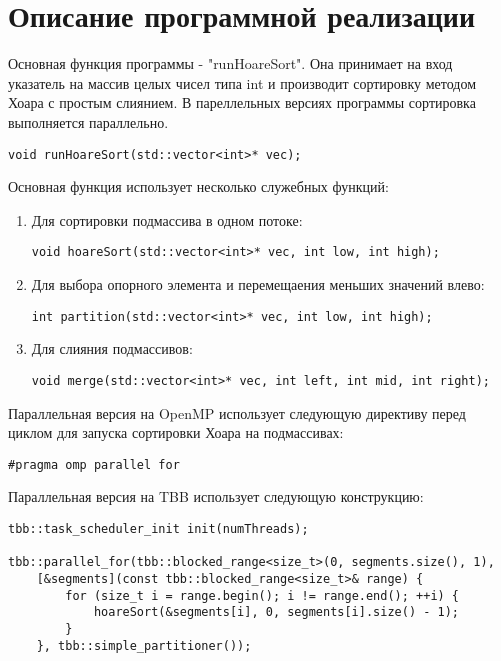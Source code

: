 \documentclass{report}
\begin{document}
\section*{Описание программной реализации}

Основная функция программы - "runHoareSort". Она принимает на вход указатель на массив целых чисел типа int и производит сортировку методом Хоара с простым слиянием. В пареллельных версиях программы сортировка выполняется параллельно.
\begin{lstlisting}
void runHoareSort(std::vector<int>* vec);
\end{lstlisting}

\par Основная функция использует несколько служебных функций:
\begin{enumerate}
\item Для сортировки подмассива в одном потоке:
\begin{lstlisting}
void hoareSort(std::vector<int>* vec, int low, int high);
\end{lstlisting}
\item Для выбора опорного элемента и перемещаения меньших значений влево:
\begin{lstlisting}
int partition(std::vector<int>* vec, int low, int high);
\end{lstlisting}
\item Для слияния подмассивов:
\begin{lstlisting}
void merge(std::vector<int>* vec, int left, int mid, int right);
\end{lstlisting}
\end{enumerate}

\par Параллельная версия на OpenMP использует следующую директиву перед циклом для запуска сортировки Хоара на подмассивах:
\begin{lstlisting}
#pragma omp parallel for
\end{lstlisting}

\par Параллельная версия на TBB использует следующую конструкцию:
\begin{lstlisting}
tbb::task_scheduler_init init(numThreads);

tbb::parallel_for(tbb::blocked_range<size_t>(0, segments.size(), 1),
    [&segments](const tbb::blocked_range<size_t>& range) {
        for (size_t i = range.begin(); i != range.end(); ++i) {
            hoareSort(&segments[i], 0, segments[i].size() - 1);
        }
    }, tbb::simple_partitioner());
\end{lstlisting}
\end{document}
